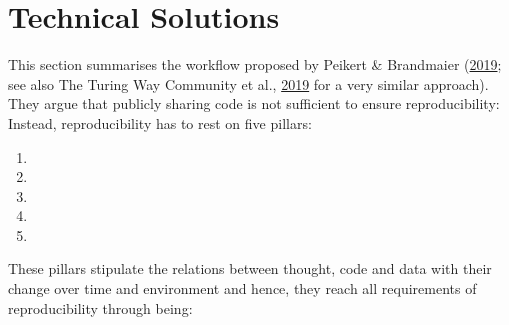 \documentclass[12pt,a4paper,]{article}
\providecommand{\tightlist}{%
  \setlength{\itemsep}{0pt}\setlength{\parskip}{0pt}}
\begin{document}
\hypertarget{technical-solutions}{%
\section{Technical Solutions}\label{technical-solutions}}

This section summarises the workflow proposed by Peikert \& Brandmaier (\protect\hyperlink{ref-peikertReproducibleDataAnalysis2019}{2019}; see also The Turing Way Community et al., \protect\hyperlink{ref-theturingwaycommunityTuringWayHandbook2019}{2019} for a very similar approach).
They argue that publicly sharing code is not sufficient to ensure reproducibility:
Instead, reproducibility has to rest on five pillars:

\begin{enumerate}
\def\labelenumi{\arabic{enumi}.}
\item
\item
\item
\item
\item
\end{enumerate}

These pillars stipulate the relations between thought, code and data with their change over time and environment and hence, they reach all requirements of reproducibility through being:
\end{document}
